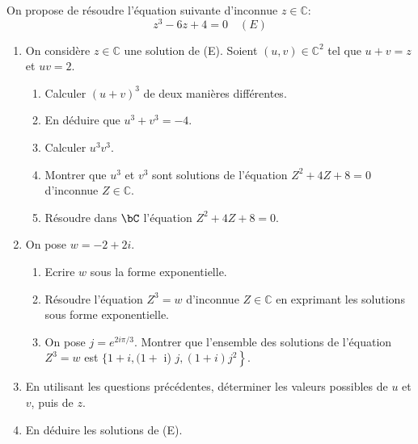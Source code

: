 \documentclass[a4paper, 11pt,reqno]{article}
\begin{document}
\begin{exercice}
On propose de résoudre l'équation suivante d'inconnue $z \in \mathbb{C}:$
$$
z^3-6 z+4=0 \quad (E)
$$
\begin{enumerate}
\item  On considère $z \in \mathbb{C}$ une solution de (E). Soient $(u, v) \in \mathbb{C}^2$ tel que $u+v=z$ et $u v=2$.
\begin{enumerate}
\item Calculer $(u+v)^3$ de deux manières différentes.
\item En déduire que $u^3+v^3=-4$.
\item  Calculer $u^3 v^3$.
\item Montrer que $u^3$ et $v^3$ sont solutions de l'équation $Z^2+4 Z+8=0$ d'inconnue $Z \in \mathbb{C}$.
\item Résoudre dans $\bC$ l'équation $Z^2+4 Z+8=0$.
\end{enumerate}
\item On pose $w=-2+2 i$.
\begin{enumerate}
\item Ecrire $w$ sous la forme exponentielle.
\item Résoudre l'équation $Z^3=w$ d'inconnue $Z \in \mathbb{C}$ en exprimant les solutions sous forme exponentielle.
\item  On pose $j=e^{2 i \pi / 3}$. Montrer que l'ensemble des solutions de l'équation $Z^3=w$ est $\{1+i,(1+$ i) $\left.j,(1+i) j^2\right\}$.
\end{enumerate}
\item En utilisant les questions précédentes, déterminer les valeurs possibles de $u$ et $v$, puis de $z$.
\item En déduire les solutions de (E).
\end{enumerate}

\end{exercice}
\end{document}
